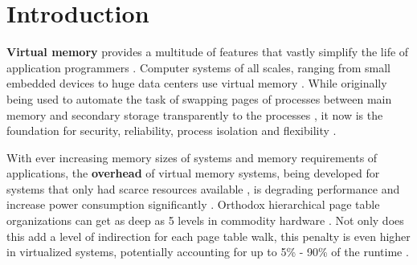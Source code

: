 \chapter{Introduction} %


















\textbf{Virtual memory} provides a multitude of features that vastly simplify the life of application programmers \cite{jacob1998virtualissues}. Computer systems of all scales, ranging from small embedded devices to huge data centers use virtual memory \cite{bhattacharjee2017architectural}.
While originally being used to automate the task of swapping pages of processes between main memory and secondary storage transparently to the processes \cite{jacob1998virtualissues}, it now is the foundation for security, reliability, process isolation and flexibility \cite{wales1999virtual,jacobVirtualMemoryContemporary1998}.

With ever increasing memory sizes of systems and memory requirements of applications, the \textbf{overhead} of virtual memory systems, being developed for systems that only had scarce resources available \cite{halbuer2023morsels}, is degrading performance and increase power consumption significantly \cite{zagieboylo2020cost}.
Orthodox hierarchical page table organizations \cite{tanenbaumOS} can get as deep as 5 levels in commodity hardware \cite{intel5LevelPaging5Level2017}. Not only does this add a level of indirection for each page table walk, this penalty is even higher in virtualized systems, potentially accounting for up to 5\% - 90\% of the runtime \cite{yaniv2016hash}.

